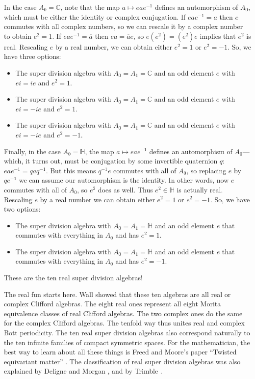 \documentclass[]{amsart}
\newcommand{\C}{{\mathbb C}}  %
\renewcommand{\H}{{\mathbb H}}  %
\theoremstyle{definition}
\begin{document}
In the case $A_0 = \C$, note that the map $a \mapsto eae^{-1}$ 
defines an automorphism of $A_0$, which must be either the identity or complex conjugation.   
If $eae^{-1} = a$ then $e$ commutes with all complex numbers, so we can rescale it by a 
complex number to obtain $e^2 = 1$.   If $eae^{-1} = \overline{a}$ then $ea =\overline{a}e$, so $e(e^2) = (e^2)e$ implies that $e^2$ is 
real.  Rescaling $e$ by a real number, we can obtain either $e^2 = 1$ or $e^2 = -1$.
So, we have three options:
\begin{itemize}
\item The super division algebra with $A_0 = A_1 = \C$ and an odd element $e$
with $ei = ie$ and $e^2 = 1$.
\item The super division algebra with $A_0 = A_1 = \C$ and an odd element $e$
with $ei = -ie$ and $e^2 = 1$.
\item The super division algebra with $A_0 = A_1 = \C$ and an odd element $e$
with $ei = -ie$ and $e^2 = -1$.
\end{itemize}

Finally, in the case $A_0 = \H$, the map $a \mapsto eae^{-1}$ defines an automorphism of $A_0$---which, it turns out, must be conjugation by some invertible quaternion $q$: $eae^{-1} = qaq^{-1}$.   But this means $q^{-1}e$ commutes with all of $A_0$, so replacing $e$ by $qe^{-1}$ we can assume our automorphism is the identity.    In other words, now $e$ commutes with all of $A_0$, so $e^2$ does as well.  Thus $e^2 \in \H$ is actually real.  Rescaling $e$ by a real number we can obtain either $e^2 = 1$ or $e^2 = -1$.   So, we have two options:
\begin{itemize}
\item The super division algebra with $A_0 = A_1 = \H$ and an odd element $e$
that commutes with everything in $A_0$ and has $e^2 = 1$.
\item
The super division algebra with $A_0 = A_1 = \H$ and an odd element $e$
that commutes with everything in $A_0$ and has $e^2 = -1$.
\end{itemize}
These are the ten real super division algebras!

The real fun starts here.  Wall showed that these ten algebras are all real or complex Clifford algebras.  The eight real ones represent all eight Morita equivalence classes of real Clifford
algebras.  The two complex ones do the same for the complex Clifford algebras.  The tenfold way thus unites real and complex Bott periodicity.   The ten real super division algebras also correspond naturally to the ten infinite families of compact symmetric spaces.  For the mathematician, the best way to learn about all these things is Freed and Moore's paper ``Twisted equivariant matter'' \cite{FM}.  The classification of real super division algebras was also explained by Deligne and Morgan \cite{DM}, and by Trimble \cite{Trimble}.
\end{document}
